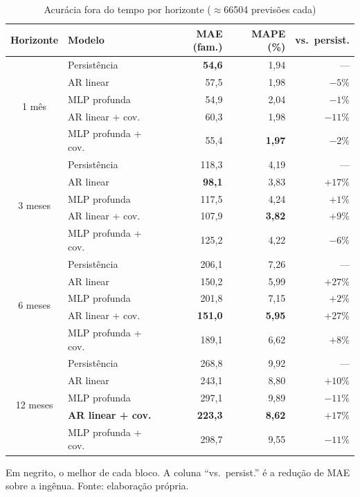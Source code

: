\documentclass[12pt,a4paper,oneside]{article}
\begin{document}
\begin{table}[H]
\centering
\caption{Acurácia fora do tempo por horizonte ($\approx$\num{66504} previsões cada)}
\label{tab:acuracia}
\small
\begin{tabular}{@{}clrrr@{}}
\toprule
\textbf{Horizonte} & \textbf{Modelo} & \textbf{MAE (fam.)} & \textbf{MAPE (\%)} & \textbf{vs.\ persist.} \\
\midrule
\multirow{5}{*}{1 mês}
 & Persistência        & \textbf{54,6}  & 1,94 & --- \\
 & AR linear           & 57,5  & 1,98 & $-5\%$ \\
 & MLP profunda        & 54,9  & 2,04 & $-1\%$ \\
 & AR linear + cov.    & 60,3  & 1,98 & $-11\%$ \\
 & MLP profunda + cov. & 55,4  & \textbf{1,97} & $-2\%$ \\
\midrule
\multirow{5}{*}{3 meses}
 & Persistência        & 118,3 & 4,19 & --- \\
 & AR linear           & \textbf{98,1}  & 3,83 & $+17\%$ \\
 & MLP profunda        & 117,5 & 4,24 & $+1\%$ \\
 & AR linear + cov.    & 107,9 & \textbf{3,82} & $+9\%$ \\
 & MLP profunda + cov. & 125,2 & 4,22 & $-6\%$ \\
\midrule
\multirow{5}{*}{6 meses}
 & Persistência        & 206,1 & 7,26 & --- \\
 & AR linear           & 150,2 & 5,99 & $+27\%$ \\
 & MLP profunda        & 201,8 & 7,15 & $+2\%$ \\
 & AR linear + cov.    & \textbf{151,0} & \textbf{5,95} & $+27\%$ \\
 & MLP profunda + cov. & 189,1 & 6,62 & $+8\%$ \\
\midrule
\multirow{5}{*}{12 meses}
 & Persistência        & 268,8 & 9,92 & --- \\
 & AR linear           & 243,1 & 8,80 & $+10\%$ \\
 & MLP profunda        & 297,1 & 9,89 & $-11\%$ \\
 & \textbf{AR linear + cov.} & \textbf{223,3} & \textbf{8,62} & \textbf{$+17\%$} \\
 & MLP profunda + cov. & 298,7 & 9,55 & $-11\%$ \\
\bottomrule
\end{tabular}
\par\smallskip
{\footnotesize Em negrito, o melhor de cada bloco. A coluna ``vs.\
persist.'' é a redução de MAE sobre a ingênua. Fonte: elaboração própria.}
\end{table}
\end{document}
